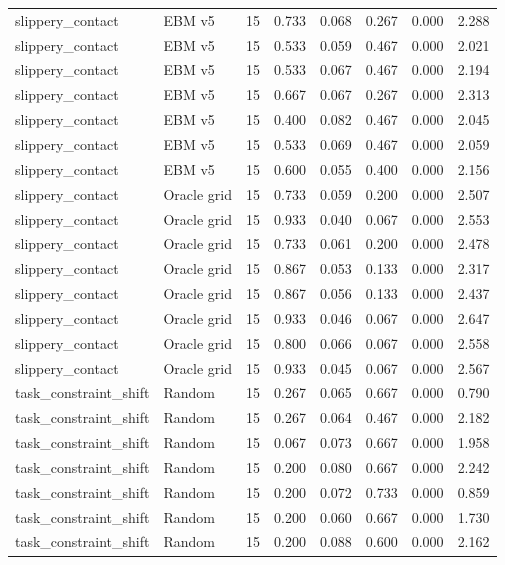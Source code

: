 {\begin{longtable}{llrrrrrr}
slippery\_contact & EBM v5 & 15 & 0.733 & 0.068 & 0.267 & 0.000 & 2.288 \\
slippery\_contact & EBM v5 & 15 & 0.533 & 0.059 & 0.467 & 0.000 & 2.021 \\
slippery\_contact & EBM v5 & 15 & 0.533 & 0.067 & 0.467 & 0.000 & 2.194 \\
slippery\_contact & EBM v5 & 15 & 0.667 & 0.067 & 0.267 & 0.000 & 2.313 \\
slippery\_contact & EBM v5 & 15 & 0.400 & 0.082 & 0.467 & 0.000 & 2.045 \\
slippery\_contact & EBM v5 & 15 & 0.533 & 0.069 & 0.467 & 0.000 & 2.059 \\
slippery\_contact & EBM v5 & 15 & 0.600 & 0.055 & 0.400 & 0.000 & 2.156 \\
slippery\_contact & Oracle grid & 15 & 0.733 & 0.059 & 0.200 & 0.000 & 2.507 \\
slippery\_contact & Oracle grid & 15 & 0.933 & 0.040 & 0.067 & 0.000 & 2.553 \\
slippery\_contact & Oracle grid & 15 & 0.733 & 0.061 & 0.200 & 0.000 & 2.478 \\
slippery\_contact & Oracle grid & 15 & 0.867 & 0.053 & 0.133 & 0.000 & 2.317 \\
slippery\_contact & Oracle grid & 15 & 0.867 & 0.056 & 0.133 & 0.000 & 2.437 \\
slippery\_contact & Oracle grid & 15 & 0.933 & 0.046 & 0.067 & 0.000 & 2.647 \\
slippery\_contact & Oracle grid & 15 & 0.800 & 0.066 & 0.067 & 0.000 & 2.558 \\
slippery\_contact & Oracle grid & 15 & 0.933 & 0.045 & 0.067 & 0.000 & 2.567 \\
task\_constraint\_shift & Random & 15 & 0.267 & 0.065 & 0.667 & 0.000 & 0.790 \\
task\_constraint\_shift & Random & 15 & 0.267 & 0.064 & 0.467 & 0.000 & 2.182 \\
task\_constraint\_shift & Random & 15 & 0.067 & 0.073 & 0.667 & 0.000 & 1.958 \\
task\_constraint\_shift & Random & 15 & 0.200 & 0.080 & 0.667 & 0.000 & 2.242 \\
task\_constraint\_shift & Random & 15 & 0.200 & 0.072 & 0.733 & 0.000 & 0.859 \\
task\_constraint\_shift & Random & 15 & 0.200 & 0.060 & 0.667 & 0.000 & 1.730 \\
task\_constraint\_shift & Random & 15 & 0.200 & 0.088 & 0.600 & 0.000 & 2.162 \\

\end{longtable}}
